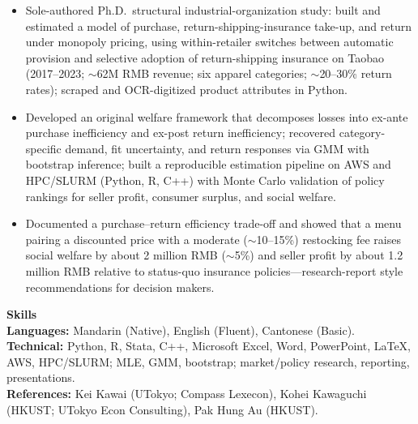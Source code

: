 \documentclass[11pt,letterpaper]{article}
\begin{document}
\begin{itemize}
  \item Sole-authored Ph.D.\ structural industrial-organization study: built and estimated a model of purchase, return-shipping-insurance take-up, and return under monopoly pricing, using within-retailer switches between automatic provision and selective adoption of return-shipping insurance on Taobao (2017--2023; \(\sim\)62M RMB revenue; six apparel categories; \(\sim\)20--30\% return rates); scraped and OCR-digitized product attributes in Python.
  \item Developed an original welfare framework that decomposes losses into ex-ante purchase inefficiency and ex-post return inefficiency; recovered category-specific demand, fit uncertainty, and return responses via GMM with bootstrap inference; built a reproducible estimation pipeline on AWS and HPC/SLURM (Python, R, C++) with Monte Carlo validation of policy rankings for seller profit, consumer surplus, and social welfare.
  \item Documented a purchase--return efficiency trade-off and showed that a menu pairing a discounted price with a moderate (\(\sim\)10--15\%) restocking fee raises social welfare by about 2 million RMB (\(\sim\)5\%) and seller profit by about 1.2 million RMB relative to status-quo insurance policies---research-report style recommendations for decision makers.
\end{itemize}

\vspace{0.15pt}

{\large \textbf{Skills}}\\[-0.5pt]
\textbf{Languages:} Mandarin (Native), English (Fluent), Cantonese (Basic).\\
\textbf{Technical:} Python, R, Stata, C++, Microsoft Excel, Word, PowerPoint, \LaTeX, AWS, HPC/SLURM; MLE, GMM, bootstrap; market/policy research, reporting, presentations.\\
\textbf{References:} Kei Kawai (UTokyo; Compass Lexecon), Kohei Kawaguchi (HKUST; UTokyo Econ Consulting), Pak Hung Au (HKUST).
\end{document}
